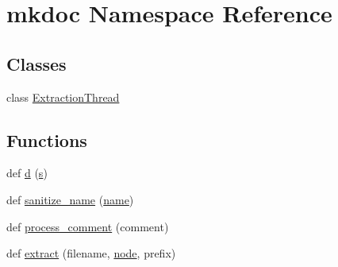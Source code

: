 \hypertarget{namespacemkdoc}{}\section{mkdoc Namespace Reference}
\label{namespacemkdoc}
\subsection*{Classes}
\begin{DoxyCompactItemize}
\item 
class \mbox{\hyperlink{classmkdoc_1_1_extraction_thread}{Extraction\+Thread}}
\end{DoxyCompactItemize}
\subsection*{Functions}
\begin{DoxyCompactItemize}
\item 
def \mbox{\hyperlink{namespacemkdoc_a85ae95dfe8536ee978dcacf1f5dcfe00}{d}} (\mbox{\hyperlink{_s_d_l__opengl_8h_a4af680a6c683f88ed67b76f207f2e6e4}{s}})
\item 
def \mbox{\hyperlink{namespacemkdoc_aba928e5c95e96f8dec657143cf20618b}{sanitize\+\_\+name}} (\mbox{\hyperlink{structname}{name}})
\item 
def \mbox{\hyperlink{namespacemkdoc_a858ea0c3045aa0c993dfa4b614a2fef0}{process\+\_\+comment}} (comment)
\item 
def \mbox{\hyperlink{namespacemkdoc_a4e290cfb6c23e5bd2f57e6686b500aa4}{extract}} (filename, \mbox{\hyperlink{node_8h_addb697c9bca6f8981a870daa4953af4f}{node}}, prefix)
\end{DoxyCompactItemize}
